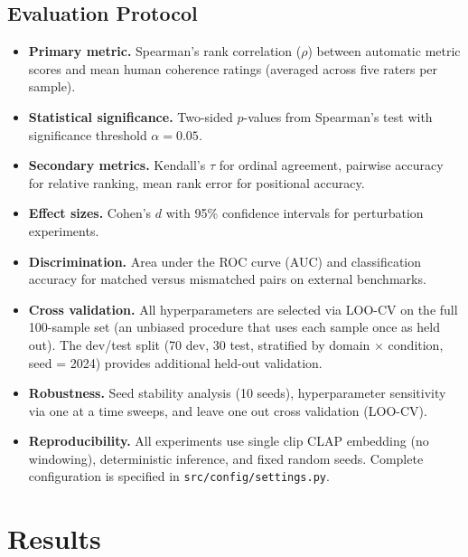 \subsection{Evaluation Protocol}\label{sec:eval-protocol}

\begin{itemize}

\item \textbf{Primary metric.}
Spearman's rank correlation ($\rho$) between automatic metric scores and mean human coherence ratings (averaged across five raters per sample).

\item \textbf{Statistical significance.}
Two-sided $p$-values from Spearman's test with significance threshold $\alpha = 0.05$.

\item \textbf{Secondary metrics.}
Kendall's $\tau$ for ordinal agreement, pairwise accuracy for relative ranking, mean rank error for positional accuracy.

\item \textbf{Effect sizes.}
Cohen's $d$ with 95\% confidence intervals for perturbation experiments.

\item \textbf{Discrimination.}
Area under the ROC curve (AUC) and classification accuracy for matched versus mismatched pairs on external benchmarks.

\item \textbf{Cross validation.}
All hyperparameters are selected via LOO-CV on the full 100-sample set (an unbiased procedure that uses each sample once as held out). The dev/test split (70 dev, 30 test, stratified by domain $\times$ condition, seed = 2024) provides additional held-out validation.

\item \textbf{Robustness.}
Seed stability analysis (10 seeds), hyperparameter sensitivity via one at a time sweeps, and leave one out cross validation (LOO-CV).

\item \textbf{Reproducibility.}
All experiments use single clip CLAP embedding (no windowing), deterministic inference, and fixed random seeds. Complete configuration is specified in \texttt{src/config/settings.py}.

\end{itemize}

\section{Results}\label{sec:results}

